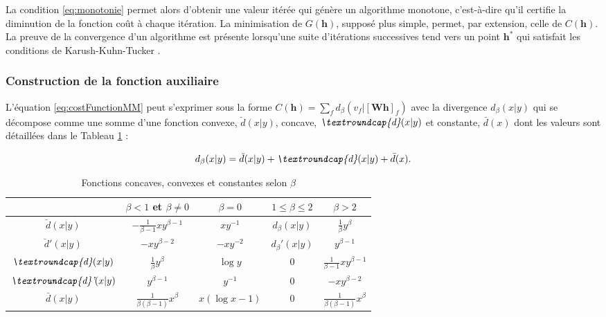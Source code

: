 La condition \ref{eq:monotonie} permet alors d'obtenir une valeur itérée qui génère un algorithme monotone, c'est-à-dire qu'il certifie la diminution de la fonction coût à chaque itération. La minimisation de $G(\mathbf{h})$, supposé plus simple, permet,  par extension, celle de $C(\mathbf{h})$. La preuve de la convergence d'un algorithme est présente lorsqu'une suite d'itérations successives tend vers un point $\mathbf{h^*}$ qui satisfait les conditions de Karush-Kuhn-Tucker \cite{fevotte_algorithms_2011, kuhn1982nonlinear}.

\subsubsection{Construction de la fonction auxiliaire}

L'équation \ref{eq:costFunctionMM} peut s'exprimer sous la forme $C(\mathbf{h}) = \sum_f d_{\beta}\left(v_f \vert \left[ \mathbf{Wh} \right]_f \right)$ avec la divergence $d_{\beta}(x \vert y)$ qui se décompose comme une somme d'une fonction convexe,  $\breve{d}(x\vert y)$, concave, $\textit{\textroundcap{d}}(x\vert y)$ et constante, $\bar{d}(x)$ dont les valeurs sont détaillées dans le Tableau \ref{tab:fonctionConcaveConvexe} : 

\begin{equation}
d_{\beta}(x\vert y) = \breve{d}(x\vert y) + \textit{\textroundcap{d}}(x\vert y) + \bar{d}(x).
\end{equation}

\begin{table}[t] 
\centering
	\begin{tabular}{|*{5}{c|}}
 		\hline			
   		 & $\beta < 1$ et $\beta \neq 0$  & $\beta = 0$ & $1 \leq \beta \leq 2$ & $\beta > 2$  \\
   		\hline
   		$\breve{d}(x\vert y)$&$-\frac{1}{\beta -1}xy^{\beta-1}$ & $xy^{-1}$ & $d_{\beta}(x\vert y)$& $\frac{1}{\beta}y^{\beta}$ \\
   		\hline
   		$\breve{d}'(x\vert y)$& $-xy^{\beta-2}$ & $-xy^{-2}$ & $d_{\beta}'(x\vert y)$ & $y^{\beta-1}$\\
   		\hline
   		$\textit{\textroundcap{d}}(x\vert y)$& $\frac{1}{\beta}y^{\beta}$ & $\log y$ & 0 & $\frac{1}{\beta-1}xy^{\beta-1}$ \\
   		\hline
   		$\textit{\textroundcap{d}'}(x\vert y)$& $y^{\beta-1}$ & $y^{-1}$ & 0 & $-xy^{\beta-2}$ \\
   		\hline
   		$\bar{d}(x\vert y)$& $\frac{1}{\beta(\beta-1)}x^{\beta}$ & $x(\log x-1)$ & 0 & $\frac{1}{\beta(\beta-1)}x^{\beta}$\\
   		\hline
 	\end{tabular}
\caption{Fonctions concaves, convexes et constantes selon $\beta$}
\label{tab:fonctionConcaveConvexe}
\end{table} 

